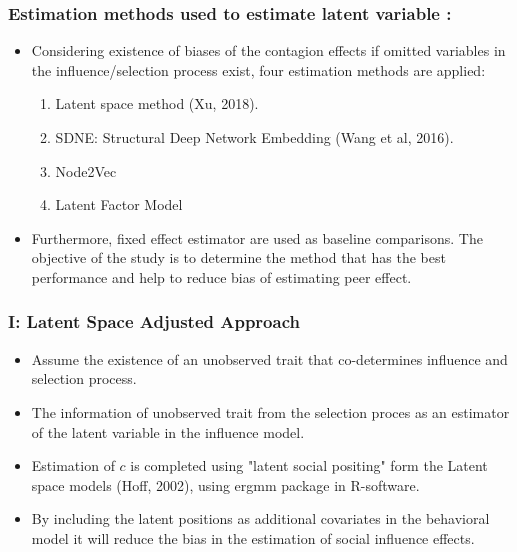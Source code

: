 \documentclass{beamer}
\begin{document}
\begin{frame}
\frametitle{Estimation methods used to estimate latent variable :}
\begin{itemize}
\item Considering existence of biases of the contagion effects if omitted variables in the influence/selection process exist, four estimation methods are applied: 
\begin{itemize}
\begin{enumerate}
 \item Latent space  method (Xu, 2018).
\vspace{10pt}
\item SDNE: Structural Deep Network Embedding (Wang et al, 2016).
\vspace {10pt}
\item Node2Vec
\vspace {10pt}
\item Latent Factor Model
\end{enumerate}
\end{itemize}
\vspace {10pt}
\item Furthermore, fixed  effect estimator are used  as baseline comparisons. The objective of the study is to determine the method that has the best performance and help to reduce bias of estimating peer effect.
\end{itemize}
\end{frame}
\begin{frame}
\frametitle{ I: Latent Space Adjusted Approach}
\begin{itemize}

\item Assume the existence of an unobserved trait that co-determines influence and selection process.
\vspace{10pt}
\item The information of unobserved trait from the selection proces as an estimator of the latent variable in the influence model.
\vspace{10}
\item  Estimation of $c$ is completed  using  "latent social positing" form the Latent space  models (Hoff, 2002), using ergmm package in R-software.
 \vspace{10pt}
  \item  By including the latent positions as additional covariates in the behavioral model it
will reduce the bias in the estimation of social influence effects.

\end{itemize}
\end{frame}
\end{document}

